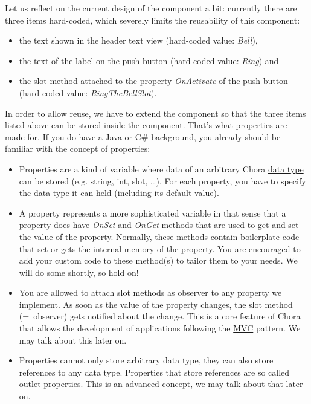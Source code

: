 \documentclass[
  a4paper,
,tablecaptionabove
]{scrbook}
\begin{document}
Let us reflect on the current design of the component a bit: currently
there are three items hard-coded, which severely limits the reusability
of this component:

\begin{itemize}
\item
  the text shown in the header text view (hard-coded value:
  \emph{Bell}),
\item
  the text of the label on the push button (hard-coded value:
  \emph{Ring}) and
\item
  the slot method attached to the property \emph{OnActivate} of the push
  button (hard-coded value: \emph{RingTheBellSlot}).
\end{itemize}

In order to allow reuse, we have to extend the component so that the
three items listed above can be stored inside the component. That's what
\href{https://doc.embedded-wizard.de/property-member}{properties} are
made for. If you do have a Java or C\# background, you already should be
familiar with the concept of properties:

\begin{itemize}
\item
  Properties are a kind of variable where data of an arbitrary Chora
  \href{https://doc.embedded-wizard.de/data-types}{data type} can be
  stored (e.g. string, int, slot, \ldots​). For each property, you have
  to specify the data type it can held (including its default value).
\item
  A property represents a more sophisticated variable in that sense that
  a property does have \emph{OnSet} and \emph{OnGet} methods that are
  used to get and set the value of the property. Normally, these methods
  contain boilerplate code that set or gets the internal memory of the
  property. You are encouraged to add your custom code to these
  method(s) to tailor them to your needs. We will do some shortly, so
  hold on!
\item
  You are allowed to attach slot methods as observer to any property we
  implement. As soon as the value of the property changes, the slot
  method (=~observer) gets notified about the change. This is a core
  feature of Chora that allows the development of applications following
  the
  \href{https://en.wikipedia.org/wiki/Model\%E2\%80\%93view\%E2\%80\%93controller}{MVC}
  pattern. We may talk about this later on.
\item
  Properties cannot only store arbitrary data type, they can also store
  references to any data type. Properties that store references are so
  called
  \href{https://doc.embedded-wizard.de/implementing-component-interface\#4}{outlet
  properties}. This is an advanced concept, we may talk about that later
  on.
\end{itemize}
\end{document}

